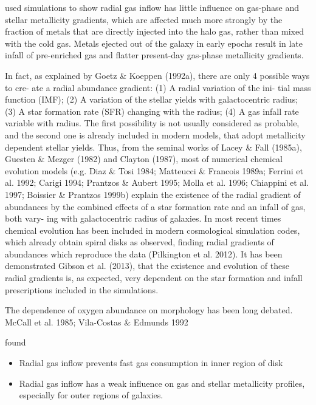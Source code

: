 \documentclass[11pt, a4paper, onecolumn]{article}
\begin{document}
\begin{multicols}{2}
    \citet{fu13} used simulations to show radial gas inflow has little
    influence on gas-phase and stellar metallicity gradients, which are
    affected much more strongly by the fraction of metals that are directly
    injected into the halo gas, rather than mixed with the cold gas. Metals
    ejected out of the galaxy in early epochs result in late infall of
    pre-enriched gas and flatter present-day gas-phase metallicity gradients.

    \citet{sanchez12} In fact, as explained by Goetz \& Koeppen (1992a),
    there are only 4 possible ways to cre- ate a radial abundance gradient:
    (1) A radial variation of the ini- tial mass function (IMF); (2) A
    variation of the stellar yields with galactocentric radius; (3) A star
    formation rate (SFR) changing with the radius; (4) A gas infall rate
    variable with radius.  The first possibility is not usually considered as
    probable, and the second one is already included in modern models, that
    adopt metallicity dependent stellar yields. Thus, from the seminal works of
    Lacey \& Fall (1985a), Guesten \& Mezger (1982) and Clayton (1987), most of
    numerical chemical evolution models (e.g.  Diaz \& Tosi 1984; Matteucci \&
    Francois 1989a; Ferrini et al.  1992; Carigi 1994; Prantzos \& Aubert
    1995; Molla et al.  1996; Chiappini et al. 1997; Boissier \& Prantzos
    1999b) explain the existence of the radial gradient of abundances by the
    combined effects of a star formation rate and an infall of gas, both
    vary- ing with galactocentric radius of galaxies. In most recent times
    chemical evolution has been included in modern cosmological simulation
    codes, which already obtain spiral disks as observed, finding radial
    gradients of abundances which reproduce the data (Pilkington et al.
    2012). It has been demonstrated Gibson et al.  (2013), that the existence
    and evolution of these radial gradients is, as expected, very dependent on
    the star formation and infall prescriptions included in the simulations.


    The dependence of oxygen abundance on morphology has been long debated.
    McCall et al. 1985; Vila-Costas \& Edmunds 1992

    \citet{fu13} found
    \begin{itemize}
    
        \item Radial gas inflow prevents fast gas consumption in inner region
        of disk

        \item Radial gas inflow has a weak influence on gas and stellar
        metallicity profiles, especially for outer regions of galaxies.


\end{itemize}
\end{multicols}
\end{document}
